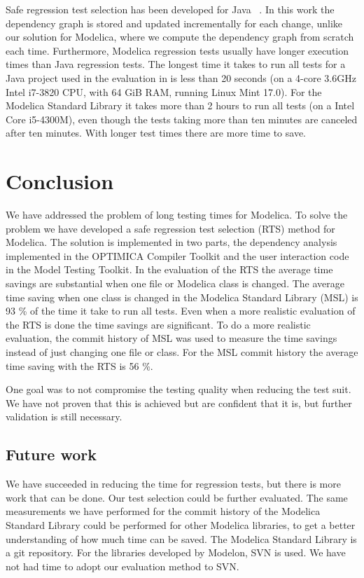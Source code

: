 \documentclass{cslthse-msc}
\begin{document}
Safe regression test selection has been developed for Java ~\cite{DBLP:conf/pppj/OqvistHM16}. In this work the dependency graph is stored and updated incrementally for each change, unlike our solution for Modelica, where we compute the dependency graph from scratch each time. Furthermore, Modelica regression tests usually have longer execution times than Java regression tests. The longest time it takes to run all tests for a Java project used in the evaluation in \cite{DBLP:conf/pppj/OqvistHM16} is less than 20 seconds (on a 4-core 3.6GHz Intel i7-3820 CPU, with 64 GiB RAM, running Linux Mint 17.0). For the Modelica Standard Library it takes more than 2 hours to run all tests (on a Intel Core i5-4300M), even though the tests taking more than ten minutes are canceled after ten minutes. With longer test times there are more time to save.

\chapter[Conclusion]{Conclusion}
We have addressed the problem of long testing times for Modelica. To solve the problem we have developed a safe regression test selection (RTS) method for Modelica. The solution is implemented in two parts, the dependency analysis implemented in the OPTIMICA Compiler Toolkit and the user interaction code in the Model Testing Toolkit. In the evaluation of the RTS the average time savings are substantial when one file or Modelica class is changed. The average time saving when one class is changed in the Modelica Standard Library (MSL) is 93 \% of the time it take to run all tests. Even when a more realistic evaluation of the RTS is done the time savings are significant. To do a more realistic evaluation, the commit history of MSL was used to measure the time savings instead of just changing one file or class. For the MSL commit history the average time saving with the RTS is 56 \%.

One goal was to not compromise the testing quality when reducing the test suit. We have not proven that this is achieved but are confident that it is, but further validation is still necessary.

\section{Future work}
We have succeeded in reducing the time for regression tests, but there is more work that can be done. Our test selection could be further evaluated. The same measurements we have performed for the commit history of the Modelica Standard Library could be performed for other Modelica libraries, to get a better understanding of how much time can be saved. The Modelica Standard Library is a git repository. For the libraries developed by Modelon, SVN is used. We have not had time to adopt our evaluation method to SVN.
\end{document}
